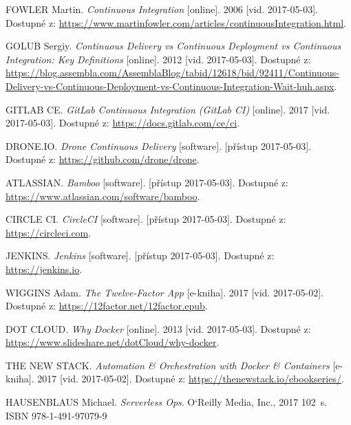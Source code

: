 \documentclass[FM,DP]{tulthesis}
\begin{document}
\begin{thebibliography}{Mm99}
FOWLER Martin. 
\emph{Continuous Integration} [online]. 
2006 [vid. 2017-05-03]. Dostupné z: 
\url{https://www.martinfowler.com/articles/continuousIntegration.html}.

GOLUB Sergiy. 
\emph{Continuous Delivery vs Continuous Deployment vs Continuous Integration: Key Definitions} [online]. 
2012 [vid. 2017-05-03]. Dostupné z: 
\url{https://blog.assembla.com/AssemblaBlog/tabid/12618/bid/92411/Continuous-Delivery-vs-Continuous-Deployment-vs-Continuous-Integration-Wait-huh.aspx}.

GITLAB CE. 
\emph{GitLab Continuous Integration (GitLab CI)} [online]. 
2017 [vid. 2017-05-03]. Dostupné z: 
\url{https://docs.gitlab.com/ce/ci}.

DRONE.IO. 
\emph{Drone Continuous Delivery} [software]. 
[přístup 2017-05-03]. Dostupné z: 
\url{https://github.com/drone/drone}.

ATLASSIAN. 
\emph{Bamboo} [software]. 
[přístup 2017-05-03]. Dostupné z: 
\url{https://www.atlassian.com/software/bamboo}.

CIRCLE CI. 
\emph{CircleCI} [software]. 
[přístup 2017-05-03]. Dostupné z: 
\url{https://circleci.com}.

JENKINS. 
\emph{Jenkins} [software]. 
[přístup 2017-05-03]. Dostupné z: 
\url{https://jenkins.io}.


WIGGINS Adam. 
\emph{The Twelve-Factor App} [e-kniha].
2017 [vid. 2017-05-02]. Dostupné z: \url{https://12factor.net/12factor.epub}.

DOT CLOUD. 
\emph{Why Docker} [online].
2013 [vid. 2017-05-03]. Dostupné z: \url{https://www.slideshare.net/dotCloud/why-docker}.

THE NEW STACK. 
\emph{Automation \& Orchestration with Docker \& Containers} [e-kniha]. 
2017 [vid. 2017-05-02]. Dostupné z: \url{https://thenewstack.io/ebookseries/}.

HAUSENBLAUS Michael. 
\emph{Serverless Ops}. 
O`Reilly Media, Inc., 2017 102~s. ISBN 978-1-491-97079-9


\end{thebibliography}


\end{document}
